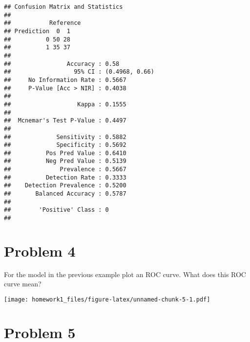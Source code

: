 \documentclass[
]{article}
\newenvironment{Shaded}{\begin{snugshade}}{\end{snugshade}}
\newcommand{\DataTypeTok}[1]{\textcolor[rgb]{0.13,0.29,0.53}{#1}}
\newcommand{\KeywordTok}[1]{\textcolor[rgb]{0.13,0.29,0.53}{\textbf{#1}}}
\newcommand{\NormalTok}[1]{#1}
\newcommand{\OperatorTok}[1]{\textcolor[rgb]{0.81,0.36,0.00}{\textbf{#1}}}
\newcommand{\OtherTok}[1]{\textcolor[rgb]{0.56,0.35,0.01}{#1}}
\newcommand{\StringTok}[1]{\textcolor[rgb]{0.31,0.60,0.02}{#1}}
\begin{document}
\begin{verbatim}
## Confusion Matrix and Statistics
## 
##           Reference
## Prediction  0  1
##          0 50 28
##          1 35 37
##                                         
##                Accuracy : 0.58          
##                  95% CI : (0.4968, 0.66)
##     No Information Rate : 0.5667        
##     P-Value [Acc > NIR] : 0.4038        
##                                         
##                   Kappa : 0.1555        
##                                         
##  Mcnemar's Test P-Value : 0.4497        
##                                         
##             Sensitivity : 0.5882        
##             Specificity : 0.5692        
##          Pos Pred Value : 0.6410        
##          Neg Pred Value : 0.5139        
##              Prevalence : 0.5667        
##          Detection Rate : 0.3333        
##    Detection Prevalence : 0.5200        
##       Balanced Accuracy : 0.5787        
##                                         
##        'Positive' Class : 0             
## 
\end{verbatim}

\hypertarget{problem-4}{%
\section{Problem 4}\label{problem-4}}

For the model in the previous example plot an ROC curve. What does this
ROC curve mean?

\begin{Shaded}
\end{Shaded}

\texttt{[image: homework1\_files/figure-latex/unnamed-chunk-5-1.pdf]}

\hypertarget{problem-5}{%
\section{Problem 5}\label{problem-5}}
\end{document}
